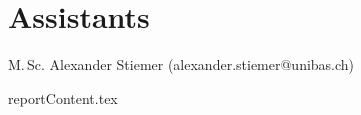 \documentclass[runningheads]{llncs}
\newenvironment{produceProceedings}{}{}
\begin{document}
\begin{produceProceedings}
	\section*{Assistants}
	M.\,Sc. Alexander Stiemer (alexander.stiemer@unibas.ch) %
	\tableofcontents
\end{produceProceedings}
	
%
\mainmatter
%

\begin{cbunit}{reportContent.tex}\end{cbunit}
\end{document}
